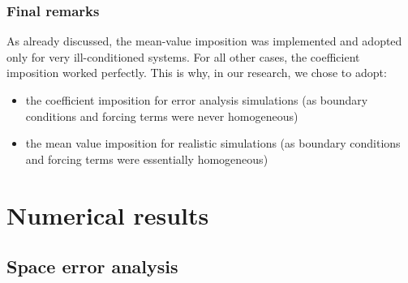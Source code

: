 \documentclass[a4paper,11pt]{article}
\begin{document}
\subsubsection{Final remarks} \label{uniqueness_results}
\noindent As already discussed, the mean-value imposition was implemented and adopted only for very ill-conditioned systems. For all other cases, the coefficient imposition worked perfectly. This is why, in our research, we chose to adopt:
\begin{itemize}
	\item the coefficient imposition for error analysis simulations (as boundary conditions and forcing terms were never homogeneous)
	\item the mean value imposition for realistic simulations (as boundary conditions and forcing terms were essentially homogeneous)
\end{itemize}


\newpage

\captionsetup{font=normalsize}

\section{Numerical results} \label{error_analysis}
\subsection{Space error analysis}
\end{document}
